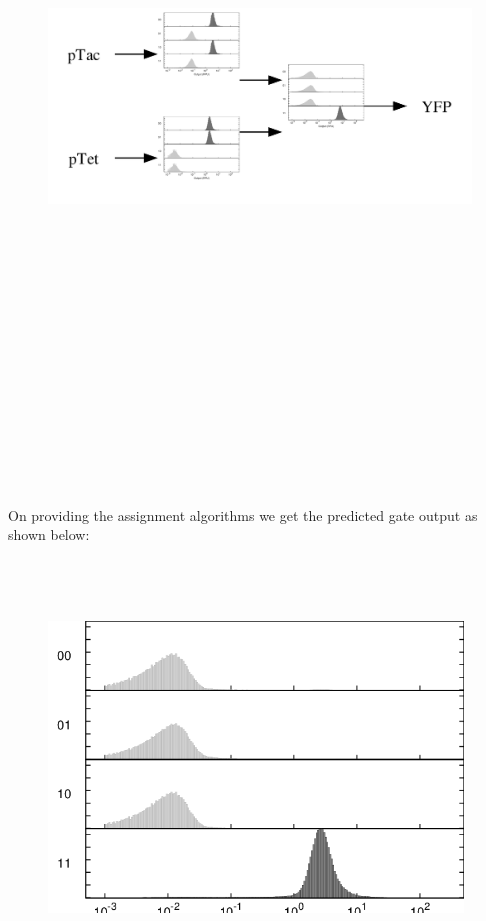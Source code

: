 \documentclass[11pt]{article}
\begin{document}
\begin{figure}[ht!]
\centering
\includegraphics[width=16cm,height=16cm,keepaspectratio]{ex_rpu.png}
\label{Predicted RPU of gate}
\end{figure}
\\[\baselineskip]   \\[\baselineskip]   \\[\baselineskip]   \\[\baselineskip]   
On providing the assignment algorithms we get the predicted gate output as shown below:
\begin{figure}[ht!]
\centering
\includegraphics[width=11cm,height=11cm,keepaspectratio]{ex_rpuOutput.png}
\label{Predicted RPU of the gate}
\end{figure}
\end{document}
